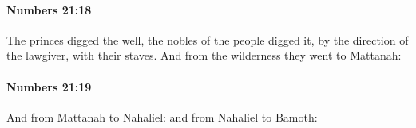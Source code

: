 		\paragraph{Numbers 21:18} %
			\label{NUMBERS-21-18}

			The princes digged the well, the nobles of the people digged it, by the direction of the lawgiver, with their staves. And from the wilderness they went to Mattanah:


		\paragraph{Numbers 21:19} %
			\label{NUMBERS-21-19}

			And from Mattanah to Nahaliel: and from Nahaliel to Bamoth:


